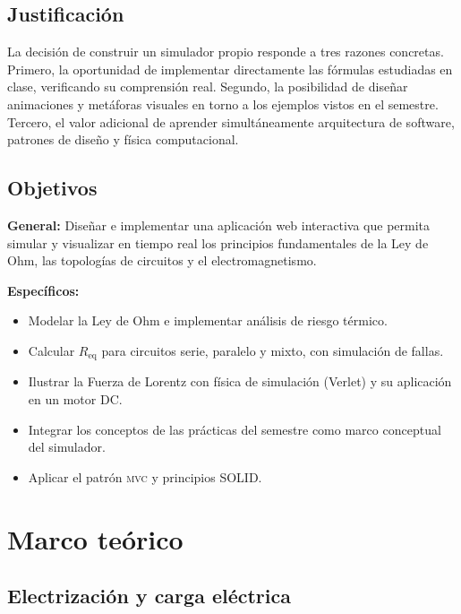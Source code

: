 \documentclass[12pt, a4paper]{article}
\newcommand{\Req}{R_{\mathrm{eq}}}
\newcommand{\mvc}{\textsc{mvc}}
\begin{document}
\subsection{Justificación}

La decisión de construir un simulador propio responde a tres razones
concretas. Primero, la oportunidad de implementar directamente las fórmulas
estudiadas en clase, verificando su comprensión real. Segundo, la
posibilidad de diseñar animaciones y metáforas visuales en torno a los
ejemplos vistos en el semestre. Tercero, el valor adicional de aprender
simultáneamente arquitectura de software, patrones de diseño y física
computacional.

\subsection{Objetivos}

\textbf{General:} Diseñar e implementar una aplicación web interactiva que
permita simular y visualizar en tiempo real los principios fundamentales de
la Ley de Ohm, las topologías de circuitos y el electromagnetismo.

\textbf{Específicos:}
\begin{itemize}[leftmargin=1.4em]
  \item Modelar la Ley de Ohm e implementar análisis de riesgo térmico.
  \item Calcular $\Req$ para circuitos serie, paralelo y mixto, con
        simulación de fallas.
  \item Ilustrar la Fuerza de Lorentz con física de simulación (Verlet) y
        su aplicación en un motor DC.
  \item Integrar los conceptos de las prácticas del semestre como marco
        conceptual del simulador.
  \item Aplicar el patrón \mvc{} y principios SOLID.
\end{itemize}

\section{Marco teórico}

\subsection{Electrización y carga eléctrica}
\end{document}

